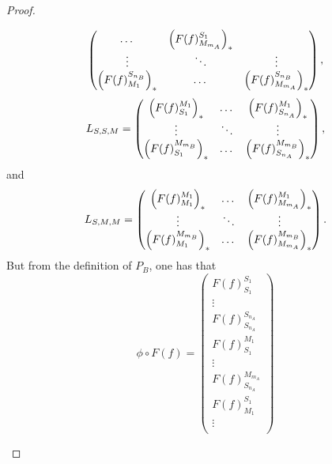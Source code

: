 \begin{proof}
\begin{enumerate}
{\[\begin{pmatrix}
                    \dots &
                    \left(  F(f)_{M_{m_A}}^{S_1}  \right)_* \\
                    \vdots & \ddots & \vdots \\
                    \left(  F(f)_{M_1}^{S_{n_B}}  \right)_* &
                    \dots &
                    \left(  F(f)_{M_{m_A}}^{S_{n_B}}  \right)_* \\
                \end{pmatrix},
            \]
            \[
                L_{S, S, M} =
                \begin{pmatrix}
                    \left(  F(f)_{S_1}^{M_1}  \right)_* &
                    \dots &
                    \left(  F(f)_{S_{n_A}}^{M_1}  \right)_* \\
                    \vdots & \ddots & \vdots \\
                    \left(  F(f)_{S_1}^{M_{m_B}}  \right)_* &
                    \dots &
                    \left(  F(f)_{S_{n_A}}^{M_{m_B}}  \right)_* \\
                \end{pmatrix},
            \]
            and
            \[
                L_{S, M, M} =
                \begin{pmatrix}
                    \left(  F(f)_{M_1}^{M_1}  \right)_* &
                    \dots &
                    \left(  F(f)_{M_{m_A}}^{M_1}  \right)_* \\
                    \vdots & \ddots & \vdots \\
                    \left(  F(f)_{M_1}^{M_{m_B}}  \right)_* &
                    \dots &
                    \left(  F(f)_{M_{m_A}}^{M_{m_B}}  \right)_* \\
                \end{pmatrix}.
            \]
            But from the definition of \( P_B \), one has that
            \[
                \phi \circ F(f) =
                \begin{pmatrix}
                    F(f)_{S_1}^{S_1} \\
                    \vdots \\
                    F(f)_{S_{n_A}}^{S_{n_A}} \\
                    F(f)_{S_1}^{M_1} \\
                    \vdots \\
                    F(f)_{S_{n_A}}^{M_{m_A}} \\
                    F(f)_{M_1}^{S_1} \\
                    \vdots \\

\end{pmatrix}\]}
\end{enumerate}
\end{proof}
